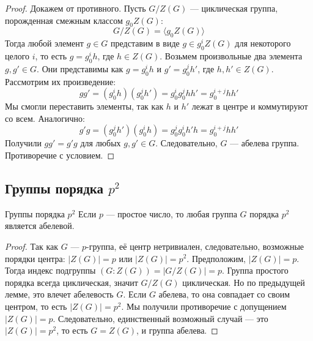 \begin{proof}
	Докажем от противного.
	Пусть $G/Z(G)$ — циклическая группа, порожденная смежным классом $g_0 Z(G)$:
	\[ G/Z(G) = \langle g_0 Z(G) \rangle \] 
	Тогда любой элемент $g \in G$ представим в виде $g \in g_0^i Z(G)$ для некоторого целого $i$, то есть $g = g_0^i h$, где $h \in Z(G)$.
	Возьмем произвольные два элемента $g, g' \in G$. Они представимы как $g = g_0^i h$ и $g' = g_0^j h'$, где $h, h' \in Z(G)$.
	Рассмотрим их произведение:
	\[ gg' = (g_0^i h)(g_0^j h') = g_0^i g_0^j h h' = g_0^{i+j} h h' \] 
	Мы смогли переставить элементы, так как $h$ и $h'$ лежат в центре и коммутируют со всем.
	Аналогично:
	\[ g'g = (g_0^j h')(g_0^i h) = g_0^j g_0^i h' h = g_0^{i+j} h h' \] 
	Получили $gg' = g'g$ для любых $g, g' \in G$.
	Следовательно, $G$ — абелева группа. Противоречие с условием.
\end{proof}

\subsection*{Группы порядка $p^2$}

\begin{Corollary}{Группы порядка $p^2$}{}
	Если $p$ — простое число, то любая группа $G$ порядка $p^2$ является абелевой.
\end{Corollary}

\begin{proof}
	Так как $G$ — $p$-группа, её центр нетривиален, следовательно, возможные порядки центра: $|Z(G)| = p$ или $|Z(G)| = p^2$.
	Предположим, $|Z(G)| = p$. Тогда индекс подгруппы $(G : Z(G)) = |G/Z(G)| = p$.
	Группа простого порядка всегда циклическая, значит $G/Z(G)$ циклическая. Но по предыдущей лемме, это влечет абелевость $G$.
	Если $G$ абелева, то она совпадает со своим центром, то есть $|Z(G)| = p^2$. Мы получили противоречие с допущением $|Z(G)| = p$.
	Следовательно, единственный возможный случай — это $|Z(G)| = p^2$, то есть $G = Z(G)$, и группа абелева.
\end{proof}
